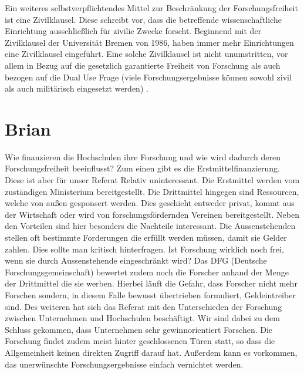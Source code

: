 \documentclass{pmwk}
\begin{document}
Ein weiteres selbstverpflichtendes Mittel zur Beschränkung der Forschungsfreiheit ist eine Zivilklausel. Diese schreibt vor, dass die betreffende wissenschaftliche Einrichtung ausschließlich für zivilie Zwecke forscht. Beginnend mit der Zivilklausel der Universität Bremen von 1986, haben immer mehr Einrichtungen eine Zivilklausel eingeführt. Eine solche Zivilklausel ist nicht unumstritten, vor allem in Bezug auf die gesetzlich garantierte Freiheit von Forschung als auch bezogen auf die Dual Use Frage (viele Forschungsergebnisse können sowohl zivil als auch militärisch eingesetzt werden) \cite{JKrause}. 

\section*{Brian}
Wie finanzieren die Hochschulen ihre Forschung und wie wird dadurch deren Forschungsfreiheit beeinflusst? Zum einen gibt es die Erstmittelfinanzierung. Diese ist aber für unser Referat Relativ uninteressant. Die Erstmittel werden vom zuständigen Ministerium bereitgestellt. Die Drittmittel hingegen sind Ressourcen, welche von außen gesponsert werden. Dies geschieht entweder privat, kommt aus der Wirtschaft oder wird von forschungsfördernden Vereinen bereitgestellt. Neben den Vorteilen sind hier besonders die Nachteile interessant. Die Aussenstehenden stellen oft bestimmte Forderungen die erfüllt werden müssen, damit sie Gelder zahlen. Dies sollte man kritisch hinterfragen. Ist Forschung wirklich noch frei, wenn sie durch Aussenstehende eingeschränkt wird? Das DFG (Deutsche Forschungsgemeinschaft) bewertet zudem noch die Forscher anhand der Menge der Drittmittel die sie werben. Hierbei läuft die Gefahr, dass Forscher nicht mehr Forschen sondern, in diesem Falle bewusst übertrieben formuliert, Geldeintreiber sind. Des weiteren hat sich das Referat mit den Unterschieden der Forschung zwischen Unternehmen und Hochschulen beschäftigt. Wir sind dabei zu dem Schluss gekommen, dass Unternehmen sehr gewinnorientiert Forschen. Die Forschung findet zudem meist hinter geschlossenen Türen statt, so dass die Allgemeinheit keinen direkten Zugriff darauf hat. Außerdem kann es vorkommen, das unerwünschte Forschungsergebnisse einfach vernichtet werden.
\end{document}
